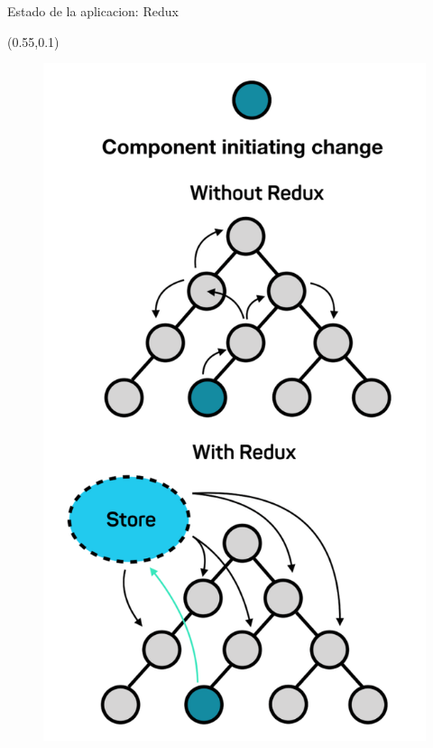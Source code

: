 \documentclass[xcolor=pdftex,dvipsnames,table]{beamer}
\begin{document}
\begin{frame}{Estado de la aplicacion: Redux}
{    \begin{textblock*}{0.45\textwidth}(0.55\textwidth,0.1\textwidth)
            \begin{figure}
                \centering
                \includegraphics[width=0.8\linewidth]{front/Bildschirmfoto-2017-12-01-um-08.53.32.png}
            \end{figure}
    \end{textblock*}
    

}
\end{frame}
\end{document}
